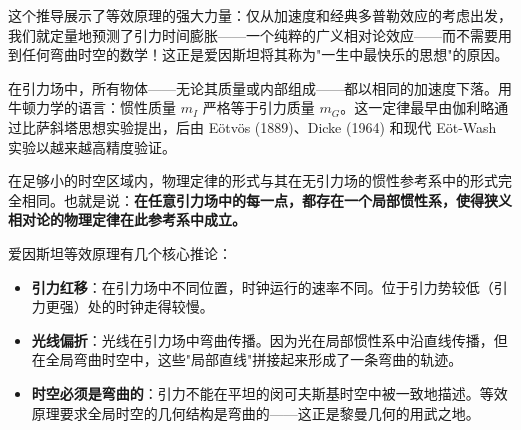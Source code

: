 这个推导展示了等效原理的强大力量：仅从加速度和经典多普勒效应的考虑出发，我们就定量地预测了引力时间膨胀——一个纯粹的广义相对论效应——而不需要用到任何弯曲时空的数学！这正是爱因斯坦将其称为"一生中最快乐的思想"的原因。

\begin{definition}
在引力场中，所有物体——无论其质量或内部组成——都以相同的加速度下落。用牛顿力学的语言：惯性质量 $m_I$ 严格等于引力质量 $m_G$。这一定律最早由伽利略通过比萨斜塔思想实验提出，后由 E\"otv\"os (1889)、Dicke (1964) 和现代 E\"ot-Wash 实验以越来越高精度验证。
\end{definition}

\begin{definition}
在足够小的时空区域内，物理定律的形式与其在无引力场的惯性参考系中的形式完全相同。也就是说：\textbf{在任意引力场中的每一点，都存在一个局部惯性系，使得狭义相对论的物理定律在此参考系中成立。}
\end{definition}

爱因斯坦等效原理有几个核心推论：
\begin{itemize}
    \item \textbf{引力红移}：在引力场中不同位置，时钟运行的速率不同。位于引力势较低（引力更强）处的时钟走得较慢。
    \item \textbf{光线偏折}：光线在引力场中弯曲传播。因为光在局部惯性系中沿直线传播，但在全局弯曲时空中，这些"局部直线"拼接起来形成了一条弯曲的轨迹。
    \item \textbf{时空必须是弯曲的}：引力不能在平坦的闵可夫斯基时空中被一致地描述。等效原理要求全局时空的几何结构是弯曲的——这正是黎曼几何的用武之地。
\end{itemize}

